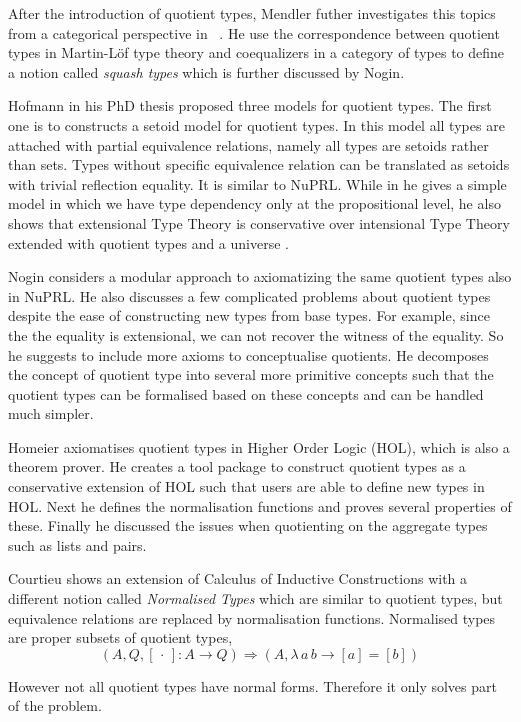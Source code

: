 \documentclass[envcountsame]{llncs}
\newcommand{\dotph}{\,\cdot\,}
\providecommand{\class}[1]{[#1]}
\newcommand{\itt}{intensional Type Theory}
\newcommand{\mltt}{Martin-L\"{o}f type theory}
\begin{document}
 After the introduction of quotient types, Mendler futher investigates
 this topics from a categorical perspective in ~\cite{men:90}. He use
 the correspondence between quotient types in \mltt{} and coequalizers
 in a category of types to define a notion called \emph{squash types}
 which is further discussed by Nogin.


Hofmann in his PhD thesis \cite{hof:phd} proposed three models for
quotient types. The first one is to constructs a setoid model for
quotient types. In this model all types are attached with partial
equivalence relations, namely all types are setoids rather than
sets. Types without specific equivalence relation can be translated as setoids with trivial reflection equality. It is similar to NuPRL. While in \cite{hof:95:sm} he gives a simple model in which we have type dependency only at the propositional level, he also shows that extensional Type Theory is conservative over \itt {}  extended with quotient types and a universe \cite{hof:95:con}.

Nogin \cite{nog:02} considers a modular approach to axiomatizing the
same quotient types also in NuPRL. He also discusses a few complicated
problems about quotient types despite the ease of constructing new types
from base types. For example, since the the equality is
extensional, we can not recover the
witness of the equality. So he suggests to include more axioms to
conceptualise quotients. He decomposes the concept of quotient type
into several more primitive concepts such that the quotient types can
be formalised based on these concepts and can be handled much
simpler. 

Homeier \cite{hom} axiomatises quotient types in Higher Order Logic
(HOL), which is also a theorem prover. He creates a tool package to
construct quotient types as a conservative extension of HOL such that
users are able to define new types in HOL. Next he defines the
normalisation functions and proves several properties of
these. Finally he discussed the issues when quotienting on the
aggregate types such as lists and pairs.


Courtieu \cite{cou:01} shows an extension of Calculus of Inductive Constructions
with a different notion called \emph{Normalised Types} which are similar to quotient types, but equivalence relations are replaced by normalisation functions. Normalised types are proper subsets of quotient types,
\[ (A, Q, \class\dotph \colon A \to Q) \Rightarrow(A, \lambda \,a \,b\to \class a = \class b)\]

However not all quotient types have normal forms. Therefore it only solves part of the problem.
\end{document}
